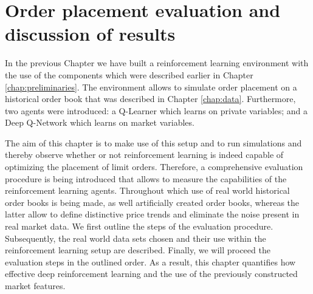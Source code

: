 \chapter{Order placement evaluation and discussion of results}
\label{chap:analysis}

In the previous Chapter we have built a reinforcement learning environment with the use of the components which were described earlier in Chapter \ref{chap:preliminaries}.
The environment allows to simulate order placement on a historical order book that was described in Chapter \ref{chap:data}.
Furthermore, two agents were introduced: a Q-Learner which learns on private variables; and a Deep Q-Network which learns on market variables.

The aim of this chapter is to make use of this setup and to run simulations and thereby observe whether or not reinforcement learning is indeed capable of optimizing the placement of limit orders.
Therefore, a comprehensive evaluation procedure is being introduced that allows to measure the capabilities of the reinforcement learning agents.
Throughout which use of real world historical order books is being made, as well artificially created order books, whereas the latter allow to define distinctive price trends and eliminate the noise present in real market data.
We first outline the steps of the evaluation procedure.
Subsequently, the real world data sets chosen and their use within the reinforcement learning setup are described.
Finally, we will proceed the evaluation steps in the outlined order.
As a result, this chapter quantifies how effective deep reinforcement learning and the use of the previously constructed market features.


